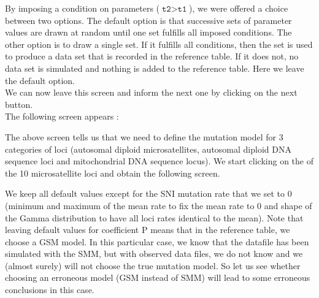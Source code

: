 By imposing a condition on parameters ($\texttt{t2}>\texttt{t1}$), we were offered a choice between two options. The default option is that successive sets of parameter values are drawn at random until one set fulfills all imposed conditions. The other option is to draw a single set. If it fulfills all conditions, then the set is used to produce a data set that is recorded in the reference table. If it does not, no data set is simulated and nothing is added to the reference table. Here we leave the default option.
\\
We can now leave this screen and inform the next one by clicking on the \fbox{\textsf{$>>$}} next button. \\
\newpage
The following screen appears :


The above screen tells us that we need to define the mutation model for 3 categories of loci (autosomal diploid microsatellites, autosomal diploid DNA sequence loci and mitochondrial DNA sequence locus).
We start clicking on the  of the 10 microsatellite loci and obtain the following screen.


We keep all default values except for the SNI mutation rate that we set to 0 (minimum and maximum of the mean rate to fix the mean rate to 0 and shape of the Gamma distribution to have all loci rates identical to the mean). Note that leaving default values for coefficient P  means that in the reference table, we choose a GSM model. In this particular case, we know that the datafile has been simulated with the SMM, but with observed data files, we do not know and we (almost surely) will not choose the true mutation model. So let us see whether choosing an erroneous model (GSM instead of SMM) will lead to some erroneous conclusions in this case.

\newpage

